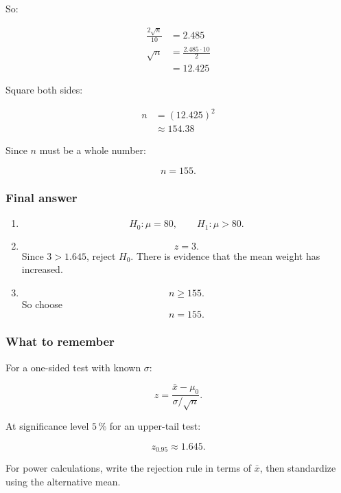 \documentclass[10pt]{article}
\begin{document}
So:

\begin{align*}
\frac{2\sqrt{n}}{10}
&=2.485 \\[2mm]
\sqrt{n}
&=
\frac{2.485\cdot 10}{2} \\[2mm]
&=12.425
\end{align*}

Square both sides:

\begin{align*}
n
&=
(12.425)^2 \\[2mm]
&\approx 154.38
\end{align*}

Since $n$ must be a whole number:

\[
n=155.
\]

\subsubsection*{Final answer}
\begin{enumerate}[label=\alph*)]
\item
\[
H_0:\mu=80,
\qquad
H_1:\mu>80.
\]

\item
\[
z=3.
\]
Since $3>1.645$, reject $H_0$.
There is evidence that the mean weight has increased.

\item
\[
n\geq 155.
\]
So choose
\[
n=155.
\]
\end{enumerate}

\subsubsection*{What to remember}
For a one-sided test with known $\sigma$:

\[
z=
\frac{\bar{x}-\mu_0}{\sigma/\sqrt{n}}.
\]

At significance level $5\,\%$ for an upper-tail test:

\[
z_{0.95}\approx 1.645.
\]

For power calculations, write the rejection rule in terms of
$\bar{x}$, then standardize using the alternative mean.
\end{document}
